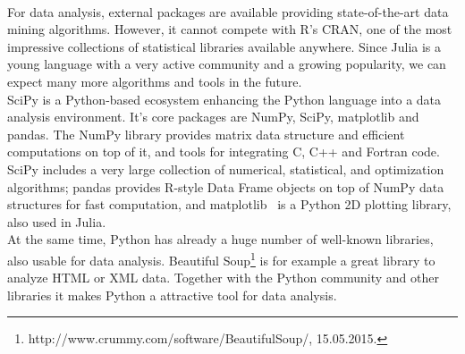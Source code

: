 \\
For data analysis, external packages are available providing state-of-the-art data mining algorithms. However, it cannot compete with R's CRAN, one of the most impressive collections of statistical libraries available anywhere. Since Julia is a young language with a very active community and a growing popularity, we can expect many more algorithms and tools in the future.
\\
SciPy is a Python-based ecosystem enhancing the Python language into a data analysis environment. It's core packages are NumPy, SciPy, matplotlib and pandas. The NumPy library provides matrix data structure and efficient computations on top of it, and tools for integrating C, C++ and Fortran code.
SciPy includes a very large collection of numerical, statistical, and optimization algorithms; pandas provides R-style Data Frame objects on top of NumPy data structures for fast computation, and matplotlib~\parencite{Hunter:2007} is a Python 2D plotting library, also used in Julia. 
\\
At the same time, Python has already a huge number of well-known libraries, also usable for data analysis. Beautiful Soup\footnote{http://www.crummy.com/software/BeautifulSoup/, 15.05.2015.} is for example a great library to analyze HTML or XML data. Together with the Python community and other libraries it makes Python a attractive tool for data analysis.


